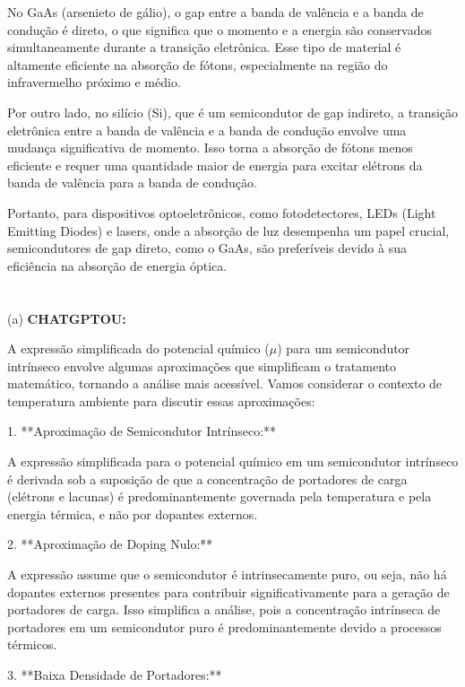 \documentclass[a4paper,10pt]{article}
\begin{document}
No GaAs (arsenieto de gálio), o gap entre a banda de valência e a banda de condução é direto, o que significa que o momento e a energia são conservados simultaneamente durante a transição eletrônica. Esse tipo de material é altamente eficiente na absorção de fótons, especialmente na região do infravermelho próximo e médio.


Por outro lado, no silício (Si), que é um semicondutor de gap indireto, a transição eletrônica entre a banda de valência e a banda de condução envolve uma mudança significativa de momento. Isso torna a absorção de fótons menos eficiente e requer uma quantidade maior de energia para excitar elétrons da banda de valência para a banda de condução.


Portanto, para dispositivos optoeletrônicos, como fotodetectores, LEDs (Light Emitting Diodes) e lasers, onde a absorção de luz desempenha um papel crucial, semicondutores de gap direto, como o GaAs, são preferíveis devido à sua eficiência na absorção de energia óptica.

\pagebreak

\section{}

(a) \textbf{CHATGPTOU:}

A expressão simplificada do potencial químico (\(\mu\)) para um semicondutor intrínseco envolve algumas aproximações que simplificam o tratamento matemático, tornando a análise mais acessível. Vamos considerar o contexto de temperatura ambiente para discutir essas aproximações:

1. **Aproximação de Semicondutor Intrínseco:**

   A expressão simplificada para o potencial químico em um semicondutor intrínseco é derivada sob a suposição de que a concentração de portadores de carga (elétrons e lacunas) é predominantemente governada pela temperatura e pela energia térmica, e não por dopantes externos.

2. **Aproximação de Doping Nulo:**

   A expressão assume que o semicondutor é intrinsecamente puro, ou seja, não há dopantes externos presentes para contribuir significativamente para a geração de portadores de carga. Isso simplifica a análise, pois a concentração intrínseca de portadores em um semicondutor puro é predominantemente devido a processos térmicos.

3. **Baixa Densidade de Portadores:**
\end{document}
